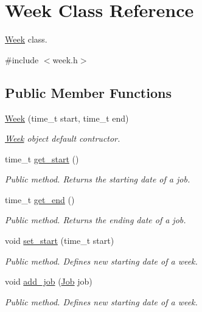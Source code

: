 \hypertarget{classWeek}{}\section{Week Class Reference}
\label{classWeek}


\hyperlink{classWeek}{Week} class.  




{\ttfamily \#include $<$week.\+h$>$}

\subsection*{Public Member Functions}
\begin{DoxyCompactItemize}
\item 
\hyperlink{classWeek_acde62b92be9795ba306655c67cb73657}{Week} (time\+\_\+t start, time\+\_\+t end)
\begin{DoxyCompactList}\small\item\em \hyperlink{classWeek}{Week} object default contructor. \end{DoxyCompactList}\item 
time\+\_\+t \hyperlink{classWeek_a09c3311872e50cc72900c97f5b2bde46}{get\+\_\+start} ()
\begin{DoxyCompactList}\small\item\em Public method. Returns the starting date of a job. \end{DoxyCompactList}\item 
time\+\_\+t \hyperlink{classWeek_a9bc75154f4fab7823f0ea9e04a69296d}{get\+\_\+end} ()
\begin{DoxyCompactList}\small\item\em Public method. Returns the ending date of a job. \end{DoxyCompactList}\item 
void \hyperlink{classWeek_a583625ac54cdbf5b38caf23c8b76ae37}{set\+\_\+start} (time\+\_\+t start)
\begin{DoxyCompactList}\small\item\em Public method. Defines new starting date of a week. \end{DoxyCompactList}\item 
void \hyperlink{classWeek_ac5f28e3ca4f43b4c4d78f9a4e140c207}{add\+\_\+job} (\hyperlink{classJob}{Job} job)
\begin{DoxyCompactList}\small\item\em Public method. Defines new starting date of a week. \end{DoxyCompactList}\end{DoxyCompactItemize}
